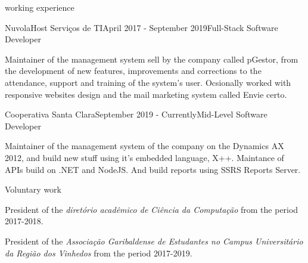 \documentclass{resume} %
\begin{document}
\begin{rSection}{working experience}

\begin{rSubsection}{NuvolaHost Servi\c{c}os de TI}{April 2017 - September 2019}{Full-Stack Software Developer}{}
\item Maintainer of the management system sell by the company called pGestor, from the development of new features, improvements and corrections to the attendance, support and training of the system's user. Ocsionally worked with  responsive websites design and the mail marketing system called Envie certo.
\end{rSubsection}

\begin{rSubsection}{Cooperativa Santa Clara}{September 2019 -  Currently}{Mid-Level Software Developer}{}
\item Maintainer of the management system of the company on the Dynamics AX 2012, and build new stuff using it's embedded language, X++. Maintance of APIs build on .NET and NodeJS. And build reports using SSRS Reports Server.
\end{rSubsection}


\end{rSection}



\begin{rSection}{Voluntary work} 
\item President of the \textit{diret\'orio acad\^emico de Ci\^encia da Computa\c{c}\~ao} from the period 2017-2018.
\item President of the \textit{Associa\c{c}\~ao Garibaldense de Estudantes no Campus Universit\'ario da Regi\~ao dos Vinhedos} from the period 2017-2019.
\end{rSection}
\end{document}
